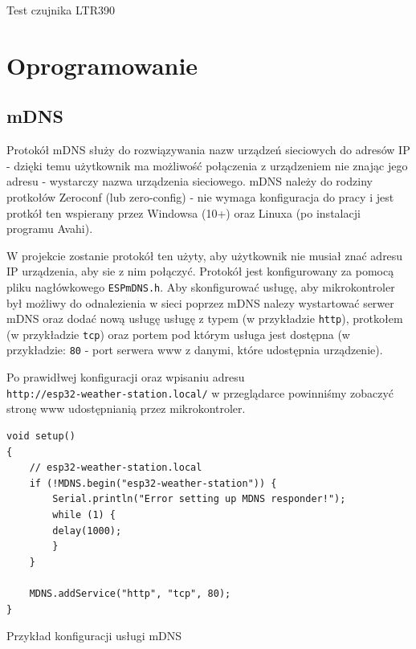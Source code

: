 \documentclass[12pt,a4paper]{article}
\begin{document}
\begin{code}[H]
\inputminted[frame=lines,]{c}{../proj/ltr390-test/ltr390-test.ino}

\caption{Test czujnika LTR390}
\end{code}

\section{Oprogramowanie}

\subsection{mDNS}

Protokół mDNS służy do rozwiązywania nazw urządzeń sieciowych do adresów IP - dzięki temu użytkownik ma możliwość połączenia z urządzeniem nie znając
jego adresu - wystarczy nazwa urządzenia sieciowego. mDNS należy do rodziny protkołów Zeroconf (lub zero-config)\cite{zeroconf-explanation} - nie wymaga konfiguracja do pracy 
i jest protkół ten wspierany przez Windowsa (10+) oraz Linuxa (po instalacji programu Avahi).

W projekcie zostanie protokół ten użyty, aby użytkownik nie musiał znać adresu IP urządzenia, aby sie z nim połączyć. 
Protokół jest konfigurowany za pomocą pliku nagłówkowego \texttt{ESPmDNS.h}. Aby skonfigurować usługę, aby mikrokontroler był możliwy do odnalezienia
w sieci poprzez mDNS nalezy wystartować serwer mDNS oraz dodać nową usługę usługę z typem (w przykładzie \texttt{http}), protkołem (w przykładzie \texttt{tcp}) 
oraz portem pod którym usługa jest dostępna (w przykładzie: \texttt{80} - port serwera www z danymi, które udostępnia urządzenie).

Po prawidłwej konfiguracji oraz wpisaniu adresu \\\texttt{http://esp32-weather-station.local/} w przeglądarce powinniśmy zobaczyć stronę www udostępnianią przez
mikrokontroler.

\begin{code}[H]
\begin{verbatim}
void setup()
{
    // esp32-weather-station.local
    if (!MDNS.begin("esp32-weather-station")) {
        Serial.println("Error setting up MDNS responder!");
        while (1) {
        delay(1000);
        }
    }

    MDNS.addService("http", "tcp", 80);
}
\end{verbatim}
\caption{Przykład konfiguracji usługi mDNS}
\end{code}
\end{document}
